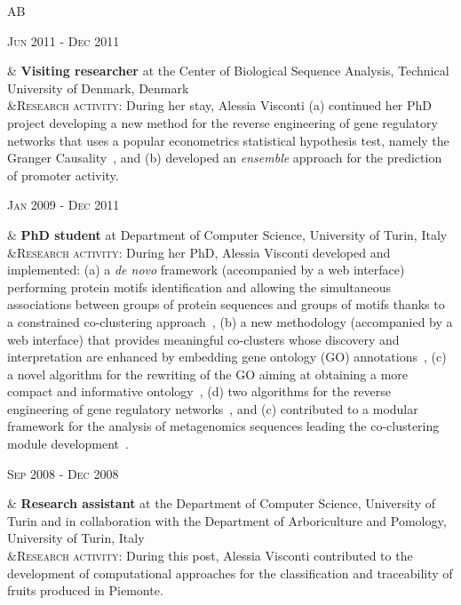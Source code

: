\documentclass[a4paper,10pt]{article}
\newenvironment{doubletablelist}
{
	\vspace{-0.2cm}
	\begin{longtable}[!h]{AB}}{\end{longtable}
}
\newcommand{\dtlist}[2]{
\hspace{-3cm}
\noindent
	\begin{minipage}{0.22\textwidth}
	\begin{flushright}
	\textsc{#1}
	\end{flushright}
	\end{minipage}
	& #2\\[0.2cm]
}
\begin{document}
\begin{doubletablelist}
{	%
	}
	\dtlist{Jun 2011 - Dec 2011}{\textbf{Visiting researcher} at the Center of Biological Sequence Analysis, Technical University of Denmark, Denmark 
	\\ %
		  &\textsc{Research activity}: During her stay, Alessia Visconti (a) continued her PhD project developing a new method for the reverse engineering of gene regulatory networks that uses a popular econometrics statistical hypothesis test, namely the Granger Causality~\cite{Vis12b}, and (b) developed an \emph{ensemble} approach for the prediction of promoter activity. %
	}
	\dtlist{Jan 2009 - Dec 2011}{\textbf{PhD student} at Department of Computer Science, University of Turin, Italy \\
	  &\textsc{Research activity}: During her PhD, Alessia Visconti developed and implemented: (a) a \emph{de novo} framework (accompanied by a web interface) performing protein motifs identification and allowing the simultaneous associations between groups of protein sequences and groups of motifs thanks to a constrained co-clustering approach~\cite{Cor09a}, (b) a new methodology (accompanied by a web interface) that provides meaningful co-clusters whose discovery and interpretation are enhanced by embedding gene ontology (GO) annotations~\cite{Vis11c,Cor09b}, (c) a novel algorithm for the rewriting of the GO aiming at obtaining a more compact and informative ontology~\cite{Vis11a,Vis10a}, (d) two algorithms for the reverse engineering of gene regulatory networks~\cite{Vis11b,Mar12,Vis12b}, and (c) contributed to a modular framework for the analysis of metagenomics sequences leading the co-clustering module development~\cite{Bon11}. %
	}
	\dtlist{Sep 2008 - Dec 2008}{\textbf{Research assistant} at the Department of Computer Science, University of Turin and in collaboration with the Department of Arboriculture and Pomology, University of Turin, Italy  \\
	 &\textsc{Research activity}: During this post, Alessia Visconti contributed to the development of computational approaches for the classification and traceability of fruits produced in Piemonte. %
	}
\end{doubletablelist}
\end{document}
